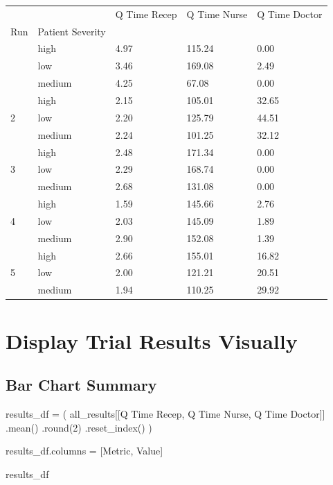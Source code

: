 \documentclass[
  letterpaper,
  DIV=11,
  numbers=noendperiod]{scrreprt}
\newenvironment{Shaded}{}{}
\newcommand{\BuiltInTok}[1]{\textcolor[rgb]{0.84,0.23,0.29}{#1}}
\newcommand{\DecValTok}[1]{\textcolor[rgb]{0.00,0.36,0.77}{#1}}
\newcommand{\NormalTok}[1]{\textcolor[rgb]{0.14,0.16,0.18}{#1}}
\newcommand{\OperatorTok}[1]{\textcolor[rgb]{0.14,0.16,0.18}{#1}}
\newcommand{\StringTok}[1]{\textcolor[rgb]{0.01,0.18,0.38}{#1}}
\begin{document}
\begin{longtable}[]{@{}lllll@{}}
\toprule\noalign{}
& & Q Time Recep & Q Time Nurse & Q Time Doctor \\
Run & Patient Severity & & & \\
\midrule\noalign{}
\endhead
\bottomrule\noalign{}
\endlastfoot
\multirow{3}{=}{1} & high & 4.97 & 115.24 & 0.00 \\
& low & 3.46 & 169.08 & 2.49 \\
& medium & 4.25 & 67.08 & 0.00 \\
\multirow{3}{=}{2} & high & 2.15 & 105.01 & 32.65 \\
& low & 2.20 & 125.79 & 44.51 \\
& medium & 2.24 & 101.25 & 32.12 \\
\multirow{3}{=}{3} & high & 2.48 & 171.34 & 0.00 \\
& low & 2.29 & 168.74 & 0.00 \\
& medium & 2.68 & 131.08 & 0.00 \\
\multirow{3}{=}{4} & high & 1.59 & 145.66 & 2.76 \\
& low & 2.03 & 145.09 & 1.89 \\
& medium & 2.90 & 152.08 & 1.39 \\
\multirow{3}{=}{5} & high & 2.66 & 155.01 & 16.82 \\
& low & 2.00 & 121.21 & 20.51 \\
& medium & 1.94 & 110.25 & 29.92 \\
\end{longtable}

\section{Display Trial Results
Visually}\label{display-trial-results-visually}

\subsection{Bar Chart Summary}\label{bar-chart-summary}

\begin{Shaded}
\begin{Highlighting}[]
\NormalTok{results\_df }\OperatorTok{=}\NormalTok{ (}
\NormalTok{    all\_results[[}\StringTok{\textquotesingle{}Q Time Recep\textquotesingle{}}\NormalTok{, }\StringTok{\textquotesingle{}Q Time Nurse\textquotesingle{}}\NormalTok{, }\StringTok{\textquotesingle{}Q Time Doctor\textquotesingle{}}\NormalTok{]]}
\NormalTok{    .mean()}
\NormalTok{    .}\BuiltInTok{round}\NormalTok{(}\DecValTok{2}\NormalTok{)}
\NormalTok{    .reset\_index()}
\NormalTok{    )}

\NormalTok{results\_df.columns }\OperatorTok{=}\NormalTok{ [}\StringTok{\textquotesingle{}Metric\textquotesingle{}}\NormalTok{, }\StringTok{\textquotesingle{}Value\textquotesingle{}}\NormalTok{]}

\NormalTok{results\_df}
\end{Highlighting}
\end{Shaded}
\end{document}
